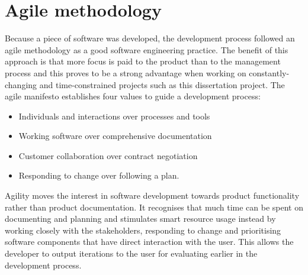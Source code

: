 \section{Agile methodology}
Because a piece of software was developed, the development process followed an agile methodology as a good software engineering practice. The benefit of this approach is that more focus is paid to the product than to the management process and this proves to be a strong advantage when working on constantly-changing and time-constrained projects such as this dissertation project.
The agile manifesto \cite{Martin2002} establishes four values to guide a development process: 
\begin{displayquote}
\begin{itemize}
  \item Individuals and interactions over processes and tools
  \item Working software over comprehensive documentation
  \item Customer collaboration over contract negotiation
  \item Responding to change over following a plan. 
\end{itemize}
\end{displayquote}

Agility moves the interest in software development towards product functionality rather than product documentation. It recognises that much time can be spent on documenting and planning and stimulates smart resource usage instead by working closely with the stakeholders, responding to change and prioritising software components that have direct interaction with the user. This allows the developer to output iterations to the user for evaluating earlier in the development process.

\iffalse
\subsection{Self-management}
Versioning software was used to manage the workflow of the different components of the system, the repositories are available online in a public GitHub repository. Links
\fi